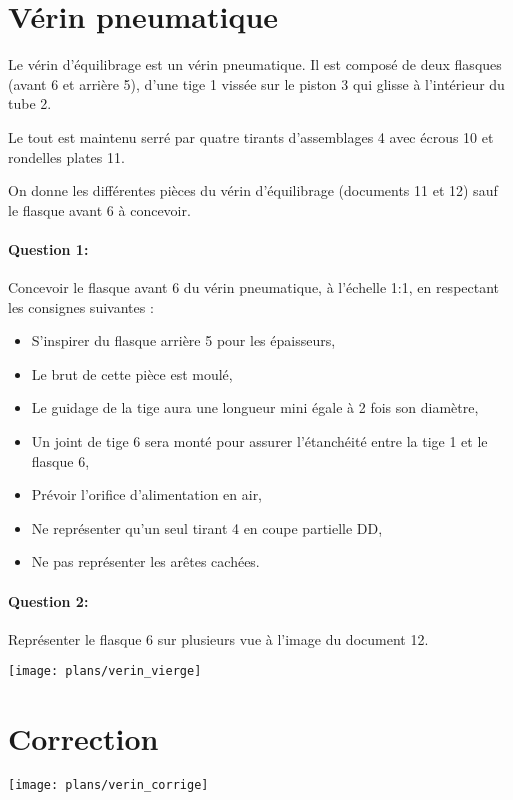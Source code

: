 

\section{Vérin pneumatique}

Le vérin d'équilibrage est un vérin pneumatique. Il est composé de deux flasques (avant 6 et arrière 5), d'une tige 1 vissée sur le piston 3 qui glisse à l'intérieur du tube 2.

Le tout est maintenu serré par quatre tirants d'assemblages 4 avec écrous 10 et rondelles plates 11.

On donne les différentes pièces du vérin d'équilibrage (documents 11 et 12) sauf le
flasque avant 6 à concevoir.

\paragraph{Question 1:} Concevoir le flasque avant 6 du vérin pneumatique, à l'échelle 1:1, en respectant les consignes suivantes :
\begin{itemize}
 \item S'inspirer du flasque arrière 5 pour les épaisseurs,
 \item Le brut de cette pièce est moulé,
 \item Le guidage de la tige aura une longueur mini égale à 2 fois son diamètre,
 \item Un joint de tige 6 sera monté pour assurer l'étanchéité entre la tige 1 et le flasque 6,
 \item Prévoir l'orifice d'alimentation en air,
 \item Ne représenter qu'un seul tirant 4 en coupe partielle DD,
 \item Ne pas représenter les arêtes cachées.
\end{itemize}

\paragraph{Question 2:} Représenter le flasque 6 sur plusieurs vue à l'image du document 12.


\newpage

\texttt{[image: plans/verin\_vierge]}



\clearpage

\ifdef{\public}{}{}

\newpage

\pagestyle{correction}\setcounter{section}{0}

\section{Correction}

\texttt{[image: plans/verin\_corrige]}





